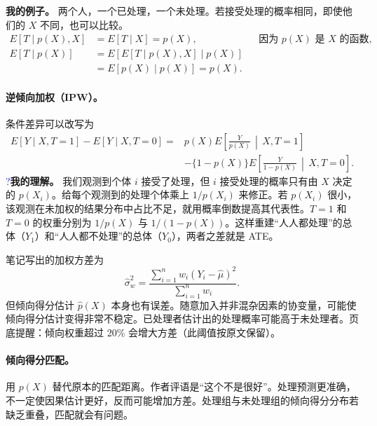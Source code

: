 \documentclass[11pt,a4paper]{article}
\newcommand{\inkblue}[1]{\textcolor{blue}{#1}}
\begin{document}
{\textbf{我的例子。} 两个人，一个已处理，一个未处理。若接受处理的概率相同，即使他们的 $X$ 不同，也可以比较。
\begin{align*}
E[T\mid p(X),X]&=E[T\mid X]=p(X), &&\text{因为 }p(X)\text{ 是 }X\text{ 的函数},\\
E[T\mid p(X)]&=E[E[T\mid p(X),X]\mid p(X)]\\
&=E[p(X)\mid p(X)]=p(X).
\end{align*}

\paragraph{逆倾向加权（IPW）。}
条件差异可以改写为
\begin{align*}
E[Y\mid X,T=1]-E[Y\mid X,T=0]
={}&p(X)E\!\left[\frac{Y}{p(X)}\,\middle|\,X,T=1\right]\\
&-\{1-p(X)\}E\!\left[\frac{Y}{1-p(X)}\,\middle|\,X,T=0\right].
\end{align*}
\inkblue{?}\quad\textbf{我的理解。} 我们观测到个体 $i$ 接受了处理，但 $i$ 接受处理的概率只有由 $X$ 决定的 $p(X_i)$。给每个观测到的处理个体乘上 $1/p(X_i)$ 来修正。若 $p(X_i)$ 很小，该观测在未加权的结果分布中占比不足，就用概率倒数提高其代表性。$T=1$ 和 $T=0$ 的权重分别为 $1/p(X)$ 与 $1/(1-p(X))$。这样重建“人人都处理”的总体（$Y_1$）和“人人都不处理”的总体（$Y_0$），两者之差就是 ATE。

笔记写出的加权方差为
\[\hat\sigma_w^2=\frac{\sum_{i=1}^n w_i(Y_i-\hat\mu)^2}{\sum_{i=1}^n w_i}.\]
但倾向得分估计 $\hat p(X)$ 本身也有误差。随意加入并非混杂因素的协变量，可能使倾向得分估计变得非常不稳定。已处理者估计出的处理概率可能高于未处理者。页底提醒：倾向权重超过 20\% 会增大方差（此阈值按原文保留）。

\paragraph{倾向得分匹配。}
用 $p(X)$ 替代原本的匹配距离。作者评语是“这个不是很好”。处理预测更准确，不一定使因果估计更好，反而可能增加方差。处理组与未处理组的倾向得分分布若缺乏重叠，匹配就会有问题。

\begin{center}
\end{center}}
\end{document}
